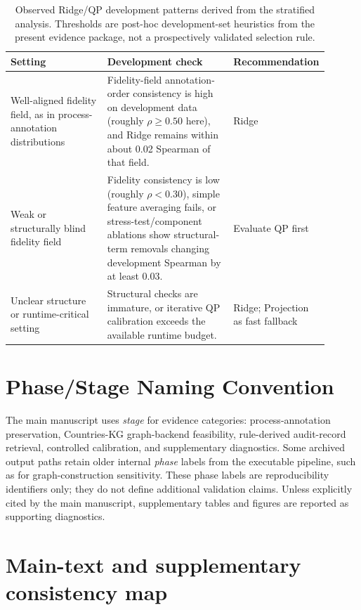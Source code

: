 \documentclass[pdflatex,sn-mathphys-num]{sn-jnl}
\begin{document}
\begin{table}[ht]
\caption{Observed Ridge/QP development patterns derived from the stratified analysis. Thresholds are post-hoc development-set heuristics from the present evidence package, not a prospectively validated selection rule.}
\label{tab:variant-policy-supp}
\centering
\small
\renewcommand{\arraystretch}{1.08}
\begin{tabular}{Z{0.32\linewidth}Z{0.42\linewidth}Z{0.16\linewidth}}
\toprule
\textbf{Setting} & \textbf{Development check} & \textbf{Recommendation} \\
\midrule
Well-aligned fidelity field, as in process-annotation distributions & Fidelity-field annotation-order consistency is high on development data (roughly $\rho \ge 0.50$ here), and Ridge remains within about 0.02 Spearman of that field. & Ridge \\
Weak or structurally blind fidelity field & Fidelity consistency is low (roughly $\rho < 0.30$), simple feature averaging fails, or stress-test/component ablations show structural-term removals changing development Spearman by at least 0.03. & Evaluate QP first \\
Unclear structure or runtime-critical setting & Structural checks are immature, or iterative QP calibration exceeds the available runtime budget. & Ridge; Projection as fast fallback \\
\bottomrule
\end{tabular}
\end{table}


\section*{Phase/Stage Naming Convention}
The main manuscript uses \emph{stage} for evidence categories: process-annotation preservation, Countries-KG graph-backend feasibility, rule-derived audit-record retrieval, controlled calibration, and supplementary diagnostics. Some archived output paths retain older internal \emph{phase} labels from the executable pipeline, such as  for graph-construction sensitivity. These phase labels are reproducibility identifiers only; they do not define additional validation claims. Unless explicitly cited by the main manuscript, supplementary tables and figures are reported as supporting diagnostics.

\section*{Main-text and supplementary consistency map}
\label{app:consistency-map}
\end{document}
